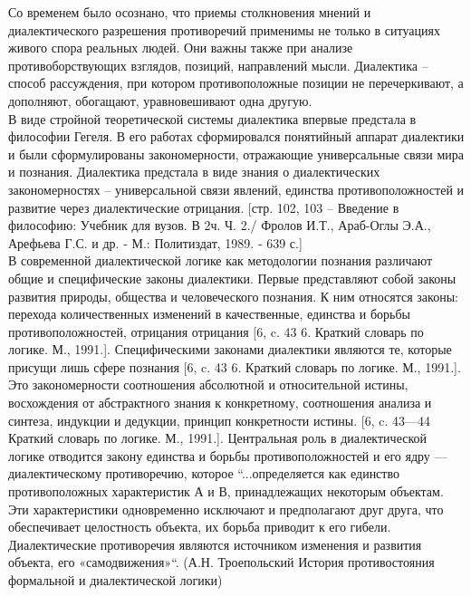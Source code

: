 \documentclass[a4paper,12pt]{report}
\begin{document}
	Со временем было осознано, что приемы столкновения мнений и диалектического разрешения противоречий применимы не только в ситуациях живого спора реальных людей. Они важны также при анализе противоборствующих взглядов, позиций, направлений мысли. Диалектика – способ рассуждения, при котором противоположные позиции не перечеркивают, а дополняют, обогащают, уравновешивают одна другую. \\

	В виде стройной теоретической системы диалектика впервые предстала в философии Гегеля. В его работах сформировался понятийный аппарат диалектики и были сформулированы закономерности, отражающие универсальные связи мира и познания. Диалектика предстала в виде знания о диалектических закономерностях – универсальной связи явлений, единства противоположностей и развитие через диалектические отрицания.  [стр. 102, 103 – Введение в философию: Учебник для вузов. В 2ч. Ч. 2./ Фролов И.Т., Араб-Оглы Э.А., Арефьева Г.С. и др. - М.: Политиздат, 1989. - 639 с.]\\

	В современной диалектической логике как методологии познания различают общие и специфические законы диалектики. Первые представляют собой законы развития природы, общества и человеческого познания. К ним относятся законы: перехода количественных изменений в качественные, единства и борьбы противоположностей, отрицания отрицания [6, c. 43 6. Краткий словарь по логике. М., 1991.]. Специфическими законами диалектики являются те, которые присущи лишь сфере познания [6, c. 43 6. Краткий словарь по логике. М., 1991.]. Это закономерности соотношения абсолютной и относительной истины, восхождения от абстрактного знания к конкретному, соотношения анализа и синтеза, индукции и дедукции, принцип конкретности истины. [6, c. 43—44  Краткий словарь по логике. М., 1991.]. Центральная роль  в диалектической логике отводится закону единства и борьбы противоположностей и его ядру — диалектическому противоречию, которое   “...определяется как единство противоположных характеристик А и В, принадлежащих некоторым объектам. Эти характеристики одновременно исключают и предполагают друг друга, что обеспечивает целостность объекта, их борьба приводит к его гибели. Диалектические противоречия являются источником изменения и развития объекта, его «самодвижения»“. (А.Н. Троепольский История противостояния формальной и диалектической логики) \\
\end{document}
